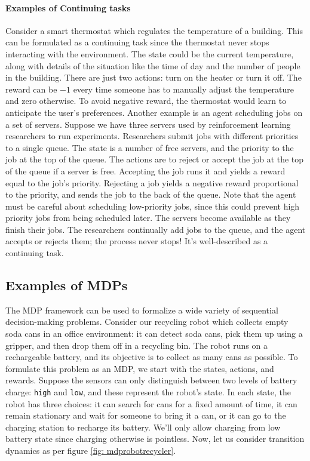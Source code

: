 \documentclass[12pt]{article}
\begin{document}
\paragraph{Examples of Continuing tasks} Consider a smart thermostat which regulates the temperature of a building. This can be formulated as a continuing task since the thermostat never stops interacting with the environment. The state could be the current temperature, along with details of the situation like the time of day and the number of people in the building. There are just two actions: turn on the heater or turn it off. The reward can be $-1$ every time someone has to manually adjust the temperature and zero otherwise. To avoid negative reward, the thermostat would learn to anticipate the user's preferences. Another example is an agent scheduling jobs on a set of servers. Suppose we have three servers used  by reinforcement learning researchers to run experiments. Researchers submit jobs with different priorities to a single queue. The state is a number of free servers, and the priority to the job at the top of the queue. The actions are to reject or accept the job at the top of the queue if a server is free. Accepting the job runs it and yields a reward equal to the job's priority. Rejecting a job yields a negative reward proportional to the priority, and sends the job to the back of the queue. Note that the agent must be careful about scheduling low-priority jobs, since this could prevent high priority jobs from being scheduled later. The servers become available as they finish their jobs. The researchers continually add jobs to the queue, and the agent accepts or rejects them; the process never stops!  It's well-described as a continuing task.

\subsection{Examples of MDPs}
The MDP framework can be used to formalize a wide variety of sequential decision-making problems.
Consider our recycling robot which collects empty soda cans in an office environment: it can detect soda cans, pick them up using a gripper, and then drop them off in a recycling bin. The robot runs on a rechargeable battery, and its objective is to collect as many cans as possible. To formulate this problem as an MDP, we start with the states, actions, and rewards. Suppose the sensors can only distinguish between two levels of battery charge: \texttt{high} and \texttt{low}, and these represent the robot's state. In each state, the robot has three choices: it can search for cans for a fixed amount of time, it can remain stationary and wait for someone to bring it a can, or it can go to the charging station to recharge its battery. We'll only allow charging from low battery state since charging otherwise is pointless. Now, let us consider transition dynamics as per figure \ref{fig: mdprobotrecycler}.
\end{document}
